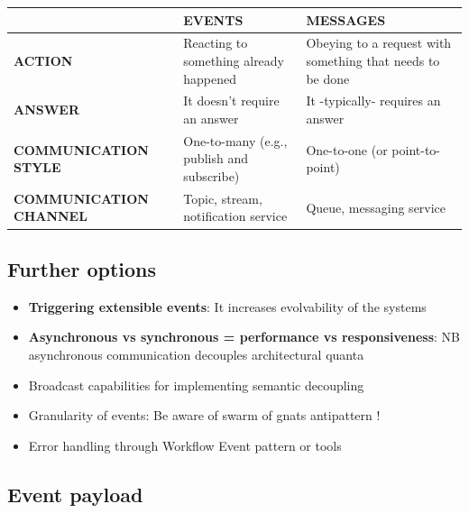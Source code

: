 \begin{table}[h!]
  \renewcommand{\arraystretch}{1.4}
  \centering
  \begin{tabularx}{\textwidth}{>{\bfseries\centering\arraybackslash}X >{\centering\arraybackslash}X >{\centering\arraybackslash}X}
    \toprule
                          & \textbf{EVENTS}                           & \textbf{MESSAGES}                                         \\
    \midrule
    ACTION                & Reacting to something already happened    & Obeying to a request with something that needs to be done \\
    \midrule
    ANSWER                & It doesn't require an answer              & It -typically- requires an answer                         \\
    \midrule
    COMMUNICATION STYLE   & One-to-many (e.g., publish and subscribe) & One-to-one (or point-to-point)                            \\
    \midrule
    COMMUNICATION CHANNEL & Topic, stream, notification service       & Queue, messaging service                                  \\
    \bottomrule
  \end{tabularx}
\end{table}

\subsection{Further options}

\begin{itemize}
  \item \textbf{Triggering extensible events}: It increases evolvability of the systems
  \item \textbf{Asynchronous vs synchronous = performance vs responsiveness}: NB asynchronous communication decouples architectural quanta
  \item Broadcast capabilities for implementing semantic decoupling
  \item Granularity of events: Be aware of swarm of gnats antipattern !
  \item Error handling through Workflow Event pattern or tools
\end{itemize}

\subsection{Event payload}

